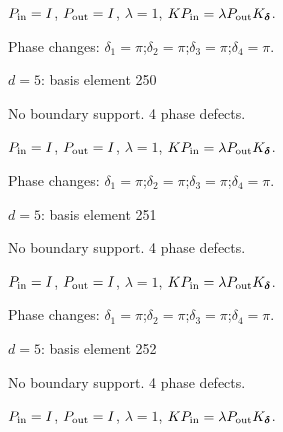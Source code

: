 $P_{\rm in}=I$, \quad $P_{\rm out}=I$, \quad $\lambda=1$, \qquad $K P_{\rm in}=\lambda P_{\rm out}K_{\boldsymbol\delta}$.
\par\smallskip\begin{minipage}{.98\linewidth}\small Phase changes: $\delta_{1}=\pi$;\quad $\delta_{2}=\pi$;\quad $\delta_{3}=\pi$;\quad $\delta_{4}=\pi$.\end{minipage}
\vfill
{\footnotesize\texttt{}}
\newpage
{}
{\Large $d=5$: basis element 250}\par
No boundary support. 4 phase defects.
\begin{center}
\end{center}
\vspace{-1mm}
$P_{\rm in}=I$, \quad $P_{\rm out}=I$, \quad $\lambda=1$, \qquad $K P_{\rm in}=\lambda P_{\rm out}K_{\boldsymbol\delta}$.
\par\smallskip\begin{minipage}{.98\linewidth}\small Phase changes: $\delta_{1}=\pi$;\quad $\delta_{2}=\pi$;\quad $\delta_{3}=\pi$;\quad $\delta_{4}=\pi$.\end{minipage}
\vfill
{\footnotesize\texttt{}}
\newpage
{}
{\Large $d=5$: basis element 251}\par
No boundary support. 4 phase defects.
\begin{center}
\end{center}
\vspace{-1mm}
$P_{\rm in}=I$, \quad $P_{\rm out}=I$, \quad $\lambda=1$, \qquad $K P_{\rm in}=\lambda P_{\rm out}K_{\boldsymbol\delta}$.
\par\smallskip\begin{minipage}{.98\linewidth}\small Phase changes: $\delta_{1}=\pi$;\quad $\delta_{2}=\pi$;\quad $\delta_{3}=\pi$;\quad $\delta_{4}=\pi$.\end{minipage}
\vfill
{\footnotesize\texttt{}}
\newpage
{}
{\Large $d=5$: basis element 252}\par
No boundary support. 4 phase defects.
\begin{center}
\end{center}
\vspace{-1mm}
$P_{\rm in}=I$, \quad $P_{\rm out}=I$, \quad $\lambda=1$, \qquad $K P_{\rm in}=\lambda P_{\rm out}K_{\boldsymbol\delta}$.
